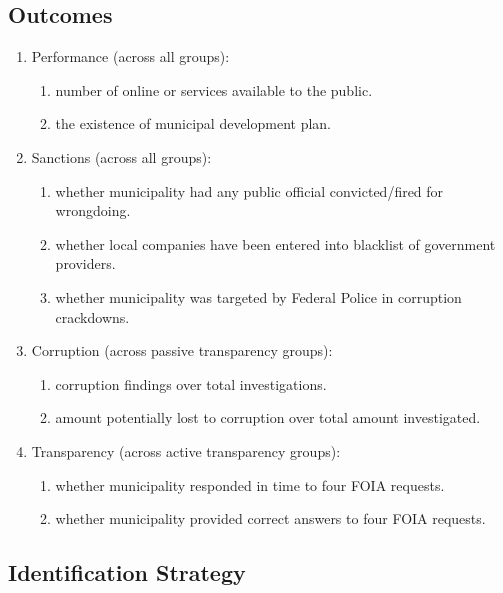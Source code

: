 \documentclass[]{article}
\begin{document}
\hypertarget{outcomes}{%
\subsection{Outcomes}\label{outcomes}}

\begin{enumerate}
\item
  Performance (across all groups):

  \begin{enumerate}
  \item
    number of online or services available to the public.
  \item
    the existence of municipal development plan.
  \end{enumerate}
\item
  Sanctions (across all groups):

  \begin{enumerate}
  \item
    whether municipality had any public official convicted/fired for
    wrongdoing.
  \item
    whether local companies have been entered into blacklist of
    government providers.
  \item
    whether municipality was targeted by Federal Police in corruption
    crackdowns.
  \end{enumerate}
\item
  Corruption (across passive transparency groups):

  \begin{enumerate}
  \item
    corruption findings over total investigations.
  \item
    amount potentially lost to corruption over total amount
    investigated.
  \end{enumerate}
\item
  Transparency (across active transparency groups):

  \begin{enumerate}
  \item
    whether municipality responded in time to four FOIA requests.
  \item
    whether municipality provided correct answers to four FOIA requests.
  \end{enumerate}
\end{enumerate}

\hypertarget{identification-strategy}{%
\subsection{Identification Strategy}\label{identification-strategy}}
\end{document}
